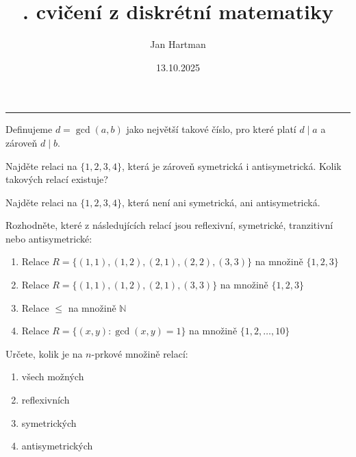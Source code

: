 \documentclass[10pt]{article}
\title{\tutnum. cvičení z diskrétní matematiky}
\author{Jan Hartman}
\date{13.10.2025}
\newcommand{\titlerule}{%
    \noindent %
    \makebox[\textwidth]{\large \thetitle \hfill \thedate}
    \rule{\textwidth}{0.4pt}%
}
\begin{document}
\titlerule

\begin{defn}
Definujeme $d = \gcd(a,b)$ jako největší takové číslo, pro které platí $d \mid a$ a zároveň $d \mid b$.
\end{defn}

\begin{problem}
Najděte relaci na $\{1,2,3,4\}$, která je zároveň symetrická i antisymetrická. Kolik takových relací existuje?
\end{problem}

\begin{problem}
Najděte relaci na $\{1,2,3,4\}$, která není ani symetrická, ani antisymetrická.
\end{problem}

\begin{problem}
Rozhodněte, které z následujících relací jsou reflexivní, symetrické, tranzitivní nebo antisymetrické:
\begin{enumerate}[label=(\alph*)]
    \item Relace $R=\{(1,1),(1,2),(2,1),(2,2),(3,3)\}$ na množině $\{1,2,3\}$
    \item Relace $R=\{(1,1),(1,2),(2,1),(3,3)\}$ na množině $\{1,2,3\}$
    \item Relace $\leq$ na množině $\mathbb{N}$
    \item Relace $R = \{ (x,y) : \gcd(x,y) = 1 \}$ na množině $\{1,2,\ldots,10\}$
\end{enumerate}
\end{problem}

\begin{problem}
Určete, kolik je na $n$-prkové množině relací:
\begin{enumerate}[label=(\alph*)]
    \item všech možných
    \item reflexivních
    \item symetrických
    \item antisymetrických
\end{enumerate}
\end{problem}
\end{document}
